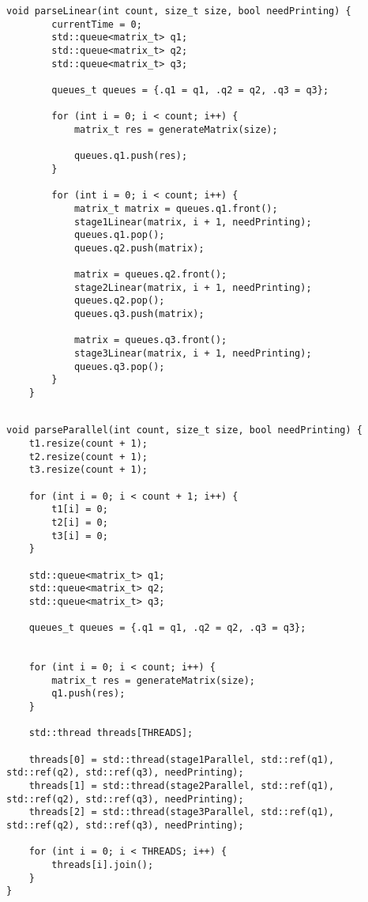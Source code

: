 \begin{center}
    \captionsetup{justification=raggedright,singlelinecheck=off}
    \begin{lstlisting}[label=lst:parse_linear,caption=Алгоритм линейной обработки матрицы]
	void parseLinear(int count, size_t size, bool needPrinting) {
		currentTime = 0;
		std::queue<matrix_t> q1;
		std::queue<matrix_t> q2;
		std::queue<matrix_t> q3;
		
		queues_t queues = {.q1 = q1, .q2 = q2, .q3 = q3};
		
		for (int i = 0; i < count; i++) {
			matrix_t res = generateMatrix(size);
			
			queues.q1.push(res);
		}
		
		for (int i = 0; i < count; i++) {
			matrix_t matrix = queues.q1.front();
			stage1Linear(matrix, i + 1, needPrinting);
			queues.q1.pop();
			queues.q2.push(matrix);
			
			matrix = queues.q2.front();
			stage2Linear(matrix, i + 1, needPrinting);
			queues.q2.pop();
			queues.q3.push(matrix);
			
			matrix = queues.q3.front();
			stage3Linear(matrix, i + 1, needPrinting);
			queues.q3.pop();
		}
	}
	
	\end{lstlisting}
\end{center}
\clearpage

\begin{center}
\captionsetup{justification=raggedright,singlelinecheck=off}
\begin{lstlisting}[label=lst:parse_parallel,caption=Алгоритм конвейерной обработки матрицы]
void parseParallel(int count, size_t size, bool needPrinting) {
	t1.resize(count + 1);
	t2.resize(count + 1);
	t3.resize(count + 1);
	
	for (int i = 0; i < count + 1; i++) {
		t1[i] = 0;
		t2[i] = 0;
		t3[i] = 0;
	}
	
	std::queue<matrix_t> q1;
	std::queue<matrix_t> q2;
	std::queue<matrix_t> q3;
	
	queues_t queues = {.q1 = q1, .q2 = q2, .q3 = q3};
	
	
	for (int i = 0; i < count; i++) {
		matrix_t res = generateMatrix(size);
		q1.push(res);
	}
	
	std::thread threads[THREADS];
	
	threads[0] = std::thread(stage1Parallel, std::ref(q1), std::ref(q2), std::ref(q3), needPrinting);
	threads[1] = std::thread(stage2Parallel, std::ref(q1), std::ref(q2), std::ref(q3), needPrinting);
	threads[2] = std::thread(stage3Parallel, std::ref(q1), std::ref(q2), std::ref(q3), needPrinting);
	
	for (int i = 0; i < THREADS; i++) {
		threads[i].join();
	}
}
\end{lstlisting}
\end{center}
\clearpage

